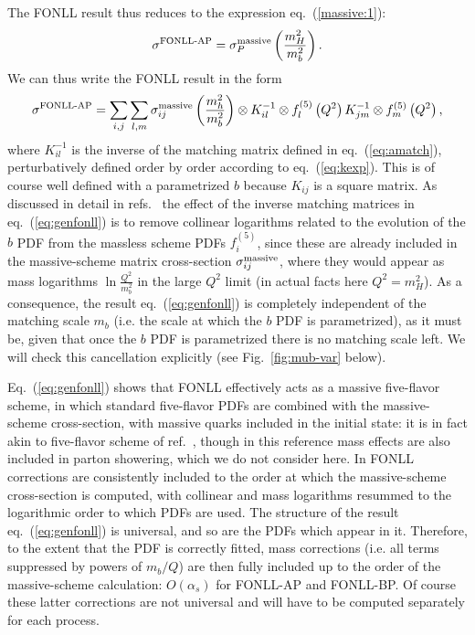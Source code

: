 The FONLL
result thus reduces to the expression eq.~(\ref{massive:1}):
\begin{equation}\label{eq:canc}
\sigma^{\text{FONLL-AP}}=\sigma_P^{\rm
  massive}\left(\frac{m_H^2}{m_b^2}\right).
\end{equation}
We can thus write the FONLL result in the form
\begin{equation}\label{eq:genfonll}
\sigma^{\text{FONLL-AP}}= \sum_{i,j}\sum_{l,m} \sigma^{\rm massive}_{ij}\left(\frac{m_h^2}{m^2_b}\right)\otimes
 K^{-1}_{il}\otimes f_{l}^{\left(5\right)}\left(Q^2\right)K^{-1}_{jm}\otimes f_{m}^{\left(5\right)}\left(Q^2\right),
\end{equation}
where $ K^{-1}_{il}$ is the inverse of the matching matrix defined in
eq.~(\ref{eq:amatch}), perturbatively defined order by order according
to eq.~(\ref{eq:kexp}). This is
of course  well defined with a parametrized $b$ because
$K_{ij}$ is  a square matrix. As discussed in detail in
refs.~\cite{Ball:2015tna,Ball:2015dpa} the effect of the inverse
matching matrices in eq.~(\ref{eq:genfonll}) is to remove collinear
logarithms related to the evolution of the $b$ PDF from the massless scheme
PDFs $f_{i}^{\left(5\right)}$, since these are already included in the
massive-scheme matrix cross-section  $\sigma^{\rm massive}_{ij}$,
where they would appear as mass logarithms $\ln\frac{Q^2}{m_b^2}$
in the large $Q^2$ limit (in actual facts here $Q^2=m_H^2$). As a
consequence, the result eq.~(\ref{eq:genfonll}) is completely
independent of the matching scale $m_b$ (i.e. the scale at which the
$b$ PDF is parametrized), as it must be, given that once
the $b$ PDF is parametrized there is no matching scale left.
We will check this cancellation explicitly (see 
Fig.~\ref{fig:mub-var} below).

Eq.~(\ref{eq:genfonll}) shows that FONLL effectively acts
as a massive five-flavor scheme, in which standard five-flavor PDFs
are combined with the massive-scheme cross-section, with massive
quarks included in the initial state: it is in fact akin to 
five-flavor scheme of ref.~\cite{Krauss:2017wmx}, though in this
reference mass effects are also included in parton showering, which we
do not consider here. In FONLL corrections are consistently
included to the order at which the massive-scheme cross-section is
computed, with collinear and mass logarithms resummed to the logarithmic
order to which PDFs are used. The structure of the result
eq.~(\ref{eq:genfonll}) is universal, and so are the PDFs which appear
in it. Therefore, to the extent that the  PDF is correctly fitted,
mass corrections (i.e. all terms suppressed by powers of $m_b/Q$) are
then fully included  up to the order of the massive-scheme
calculation:   $O(\alpha_s)$ for FONLL-AP and FONLL-BP. Of course
these latter corrections are not universal and will have to be computed
separately for each process.

